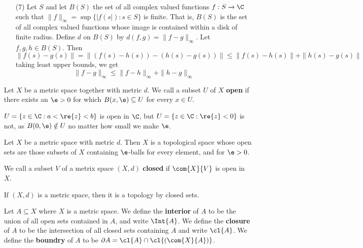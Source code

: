 \begin{example}
\begin{enumerate}
    \item[(7)] Let $S$ and let  $B(S)$ the set of all complex valued functions
        $f:S \xrightarrow{} \C$ such that $\|f\|_\infty=\sup{\{|f(s|) : s \in
        S\}}$ is finite. That is, $B(S)$ is the set of all complex valued
        functions whose image is contained within a disk of finite radius.
        Define $d$ on  $B(S)$ by $d(f,g)=\|f-g\|_\infty$. Let $f,g,h \in B(S)$.
        Then
        \begin{equation*}
            \|f(s)-g(s)\|=\|(f(s)-h(s))-(h(s)-g(s))\| \leq
            \|f(s)-h(s)\|+\|h(s)-g(s)\|
        \end{equation*}
        taking least upper bounds, we get
        \begin{equation*}
            \|f-g\|_\infty \leq \|f-h\|_\infty+\|h-g\|_\infty
        \end{equation*}
    \end{enumerate}
\end{example}

\begin{definition}
     Let $X$ be a metric space together with metric $d$. We call a subset $U$ of
     $X$  \textbf{open} if there exists an $\e>0$ for which  $B(x,\e) \subseteq
     U$ for every $x \in U$.
\end{definition}

\begin{example}\label{example_2.2}
    $U=\{z \in \C : a< \re{z}<b\}$ is open in $\C$, but  $U=\{z \in \C :
    \re{z}<0\}$ is not, as $B(0,\e) \notin U$ no matter how small we make $\e$.
\end{example}

\begin{theorem}\label{2.1.1}
    Let $X$ be a metric space with metric  $d$. Then $X$ is a topological space
    whose open sets are those subsets of  $X$ containing $\e$-balls for every
    element, and for $\e>0$.
\end{theorem}

\begin{definition}
    We call a subset $V$ of a metrix space $(X,d)$ \textbf{closed} if
    $\com{X}{V}$ is open in $X$.
\end{definition}

\begin{lemma}\label{2.1.2}
    If $(X,d)$ is a metric space, then it is a topology by closed sets.
\end{lemma}

\begin{definition}
    Let $A \subseteq X$ where $X$ is a metric space. We define the
    \textbf{interior} of $A$ to be the union of all open sets contained in $A$,
    and write $\Int{A}$. We define the \textbf{closure} of $A$ to be the
    intersection of all closed sets containing  $A$ and write  $\cl{A}$. We
    define the \textbf{boundry} of $A$ to be  $\partial{A}=\cl{A} \cap
    \cl{(\com{X}{A})}$.
\end{definition}


